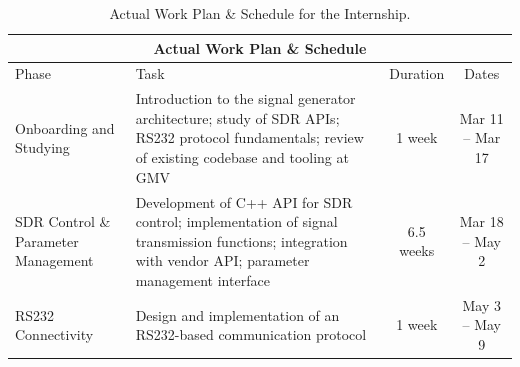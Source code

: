 \begin{table}[htbp]
      \centering
      \caption{Actual Work Plan \& Schedule for the Internship.}
      \label{tab:actual_work_plan_schedule}
      \begin{tabular}{|p{3cm}|p{8cm}|c|c|}
            \hline
            \multicolumn{4}{|c|}{\textbf{Actual Work Plan \& Schedule}}                                                                                                                                                                                                  \\
            \hline
            Phase                                                                                    & Task                                                                                                                                & Duration & Dates            \\
            \hline
            Onboarding and Studying                                                                  &
            Introduction to the signal generator architecture; study of \gls{SDR}
            APIs; \gls{RS232} protocol fundamentals; review of existing codebase
            and tooling at \gls{GMV}                                                                 &
            1 week                                                                                   & Mar 11 -- Mar 17                                                                                                                                                  \\
            \hline
            \gls{SDR} Control \& Parameter Management                                                &
            Development of C++ API for \gls{SDR} control; implementation of signal
            transmission functions; integration with vendor API; parameter
            management interface                                                                     &
            6.5 weeks                                                                                & Mar 18 -- May 2                                                                                                                                                   \\
            \hline
            \gls{RS232} Connectivity                                                                &
            Design and implementation of an \gls{RS232}-based communication protocol                                                                 &
            1 week                                                                                   & May 3 -- May 9                                                                                                                                                    \\

\end{tabular}
\end{table}

